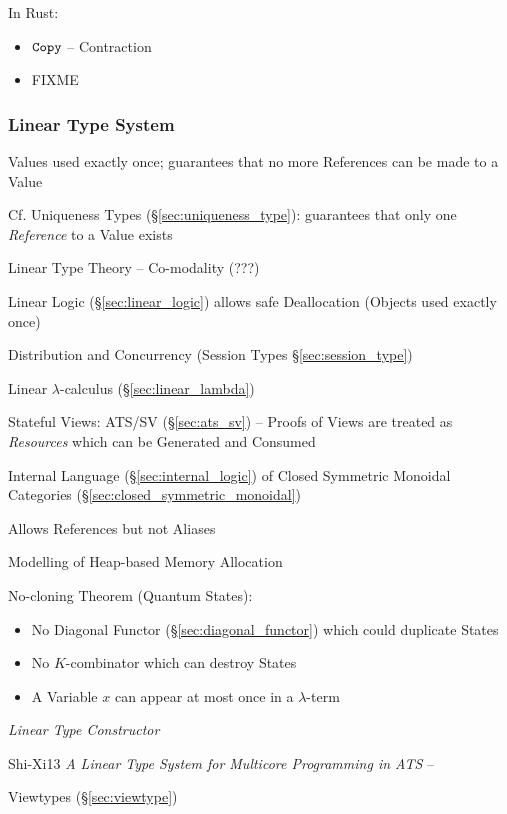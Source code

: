 In Rust:

\begin{itemize}
  \item $\mathtt{Copy}$ -- Contraction
  \item FIXME
\end{itemize}



\subsubsection{Linear Type System}\label{sec:linear_type}

Values used exactly once; guarantees that no more References can be
made to a Value

\fist Cf. Uniqueness Types (\S\ref{sec:uniqueness_type}): guarantees
that only one \emph{Reference} to a Value exists

Linear Type Theory -- Co-modality (???) %

Linear Logic (\S\ref{sec:linear_logic}) allows safe Deallocation
(Objects used exactly once)

Distribution and Concurrency (Session Types \S\ref{sec:session_type})

Linear $\lambda$-calculus (\S\ref{sec:linear_lambda})

Stateful Views: ATS/SV (\S\ref{sec:ats_sv}) -- Proofs of Views are
treated as \emph{Resources} which can be Generated and Consumed

Internal Language (\S\ref{sec:internal_logic}) of Closed Symmetric
Monoidal Categories (\S\ref{sec:closed_symmetric_monoidal})

Allows References but not Aliases

Modelling of Heap-based Memory Allocation

No-cloning Theorem (Quantum States):
\begin{itemize}
  \item No Diagonal Functor (\S\ref{sec:diagonal_functor})
    which could duplicate States
  \item No $K$-combinator which can destroy States
  \item A Variable $x$ can appear at most once in a $\lambda$-term
\end{itemize}

\emph{Linear Type Constructor} %


Shi-Xi13 \emph{A Linear Type System for Multicore Programming in ATS} --

\fist Viewtypes (\S\ref{sec:viewtype})

